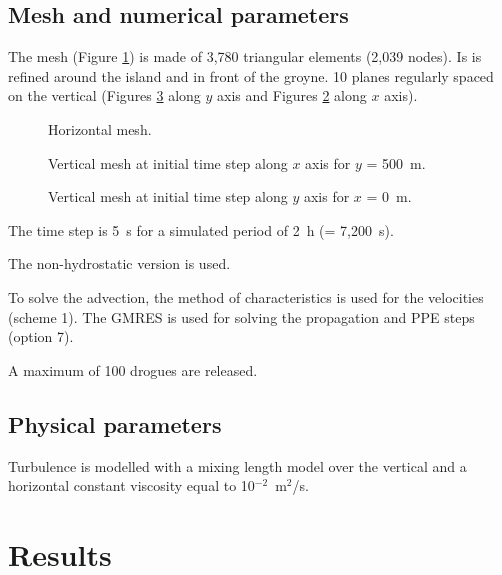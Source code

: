 \subsection{Mesh and numerical parameters}

The mesh (Figure \ref{t3d:particles:fig:meshH})
is made of 3,780 triangular elements (2,039 nodes).
Is is refined around the island and in front of the groyne.
10 planes regularly spaced on the vertical
(Figures \ref{t3d:particles:fig:meshVy} along $y$ axis and
 Figures \ref{t3d:particles:fig:meshVx} along $x$ axis).

\begin{figure}[!htbp]
 \centering
 \caption{Horizontal mesh.}
 \label{t3d:particles:fig:meshH}
\end{figure}

\begin{figure}[!htbp]
 \centering
 \caption{Vertical mesh at initial time step along $x$ axis for $y$ = 500~m.}
 \label{t3d:particles:fig:meshVx}
\end{figure}

\begin{figure}[!htbp]
 \centering
 \caption{Vertical mesh at initial time step along $y$ axis for $x$ = 0~m.}
 \label{t3d:particles:fig:meshVy}
\end{figure}

The time step is 5~s for a simulated period of  2~h (= 7,200~s).

The non-hydrostatic version is used.

To solve the advection, the method of characteristics
is used for the velocities (scheme 1).
The GMRES is used for solving the propagation and PPE steps (option 7).

A maximum of 100 drogues are released.

\subsection{Physical parameters}

Turbulence is modelled with a mixing length model over the vertical
and a horizontal constant viscosity equal to 10$^{-2}$~m$^2$/s.

\section{Results}

